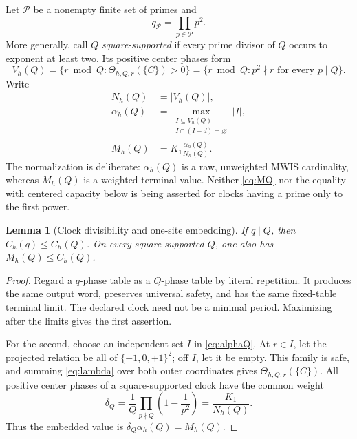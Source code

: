\documentclass[11pt]{article}
\newtheorem{lemma}[theorem]{Lemma}
\theoremstyle{definition}
\theoremstyle{remark}
\newcommand{\T}{\{-1,0,+1\}}
\begin{document}
Let \(\mathcal P\) be a nonempty finite set of primes and
\[
 q_{\mathcal P}=\prod_{p\in\mathcal P}p^2.
\]
More generally, call \(Q\) \emph{square-supported} if every prime divisor
of \(Q\) occurs to exponent at least two.  Its positive center phases form
\[
 V_h(Q)=\{r\bmod Q:\Theta_{h,Q,r}(\{C\})>0\}
       =\{r\bmod Q:p^2\nmid r\text{ for every }p\mid Q\}.
\]
Write
\begin{align}
 N_h(Q)&=|V_h(Q)|,\label{eq:NQ}\\
 \alpha_h(Q)&=\max_{\substack{I\subseteq V_h(Q)\\
 I\cap(I+d)=\varnothing}}|I|,\label{eq:alphaQ}\\
 M_h(Q)&=K_1\frac{\alpha_h(Q)}{N_h(Q)}.
 \label{eq:MQ}
\end{align}
The normalization is deliberate: \(\alpha_h(Q)\) is a raw, unweighted
MWIS cardinality, whereas \(M_h(Q)\) is a weighted terminal value.
Neither \eqref{eq:MQ} nor the equality with centered capacity below is
being asserted for clocks having a prime only to the first power.

\begin{lemma}[Clock divisibility and one-site embedding]
\label{lem:clock-divisibility}
If \(q\mid Q\), then \(C_h(q)\leq C_h(Q)\).  On every square-supported
\(Q\), one also has \(M_h(Q)\leq C_h(Q)\).
\end{lemma}

\begin{proof}
Regard a \(q\)-phase table as a \(Q\)-phase table by literal repetition.
It produces the same output word, preserves universal safety, and has the
same fixed-table terminal limit.  The declared clock need not be a
minimal period.  Maximizing after the limits gives the first assertion.

For the second, choose an independent set \(I\) in
\eqref{eq:alphaQ}.  At \(r\in I\), let the projected relation be all of
\(\T^2\); off \(I\), let it be empty.  This family is safe, and summing
\eqref{eq:lambda} over both outer coordinates gives
\(\Theta_{h,Q,r}(\{C\})\).  All positive center phases of a
square-supported clock have the common weight
\begin{equation}
 \delta_Q=\frac1Q\prod_{p\nmid Q}\left(1-\frac1{p^2}\right)
 =\frac{K_1}{N_h(Q)}.
 \label{eq:deltaQ}
\end{equation}
Thus the embedded value is
\(\delta_Q\alpha_h(Q)=M_h(Q)\).
\end{proof}
\end{document}

